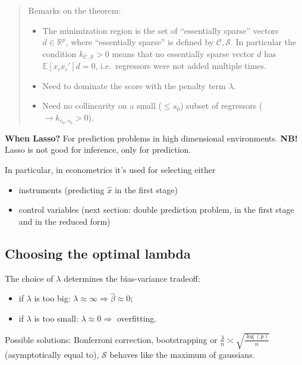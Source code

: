 \documentclass[12pt,]{book}
\providecommand{\tightlist}{%
  \setlength{\itemsep}{0pt}\setlength{\parskip}{0pt}}
\begin{document}
\begin{quote}
Remarks on the theorem:

\begin{itemize}
\tightlist
\item
  The minimization region is the set of ``essentially sparse'' vectors \(d \in \mathbb R^p\), where ``essentially sparse'' is defined by \(\mathcal{C}, \mathcal{S}\). In particular the condition \(k_{\mathcal{C}, \mathcal{S}}>0\) means that no essentially sparse vector \(d\) has \(\mathbb E[x_i x_i']d = 0\), i.e.~regressors were not added multiple times.
\item
  Need to dominate the score with the penalty term \(\lambda\).
\item
  Need no collinearity on a small (\(\leq s_0\)) subset of regressors (\(\to k_{c_0, s_0}>0\)).
\end{itemize}
\end{quote}

\textbf{When Lasso?} For prediction problems in high dimensional environments. \textbf{NB!} Lasso is not good for inference, only for prediction.

In particular, in econometrics it's used for selecting either

\begin{itemize}
\tightlist
\item
  instruments (predicting \(\hat{x}\) in the first stage)
\item
  control variables (next section: double prediction problem, in the first stage and in the reduced form)
\end{itemize}

\hypertarget{choosing-the-optimal-lambda}{%
\subsection{Choosing the optimal lambda}\label{choosing-the-optimal-lambda}}

The choice of \(\lambda\) determines the bias-variance tradeoff:

\begin{itemize}
\tightlist
\item
  if \(\lambda\) is too big: \(\lambda \approx \infty \mathbb \Rightarrow \hat{\beta} \approx 0\);
\item
  if \(\lambda\) is too small: \(\lambda \approx 0 \mathbb \Rightarrow\) overfitting.
\end{itemize}

Possible solutions: Bonferroni correction, bootstrapping or \(\frac{\lambda}{n} \asymp \sqrt{\frac{\log(p)}{n}}\) (asymptotically equal to), \(\mathcal{S}\) behaves like the maximum of gaussians.
\end{document}
